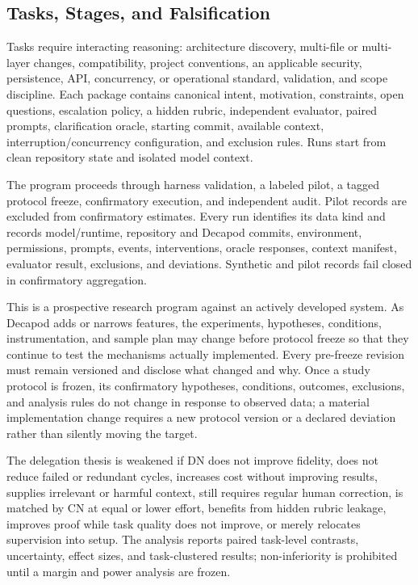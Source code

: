 \subsection{Tasks, Stages, and Falsification}

Tasks require interacting reasoning: architecture discovery, multi-file or multi-layer changes, compatibility, project conventions, an applicable security, persistence, API, concurrency, or operational standard, validation, and scope discipline. Each package contains canonical intent, motivation, constraints, open questions, escalation policy, a hidden rubric, independent evaluator, paired prompts, clarification oracle, starting commit, available context, interruption/concurrency configuration, and exclusion rules. Runs start from clean repository state and isolated model context.

The program proceeds through harness validation, a labeled pilot, a tagged protocol freeze, confirmatory execution, and independent audit. Pilot records are excluded from confirmatory estimates. Every run identifies its data kind and records model/runtime, repository and Decapod commits, environment, permissions, prompts, events, interventions, oracle responses, context manifest, evaluator result, exclusions, and deviations. Synthetic and pilot records fail closed in confirmatory aggregation.

This is a prospective research program against an actively developed system. As Decapod adds or narrows features, the experiments, hypotheses, conditions, instrumentation, and sample plan may change before protocol freeze so that they continue to test the mechanisms actually implemented. Every pre-freeze revision must remain versioned and disclose what changed and why. Once a study protocol is frozen, its confirmatory hypotheses, conditions, outcomes, exclusions, and analysis rules do not change in response to observed data; a material implementation change requires a new protocol version or a declared deviation rather than silently moving the target.

The delegation thesis is weakened if DN does not improve fidelity, does not reduce failed or redundant cycles, increases cost without improving results, supplies irrelevant or harmful context, still requires regular human correction, is matched by CN at equal or lower effort, benefits from hidden rubric leakage, improves proof while task quality does not improve, or merely relocates supervision into setup. The analysis reports paired task-level contrasts, uncertainty, effect sizes, and task-clustered results; non-inferiority is prohibited until a margin and power analysis are frozen.

